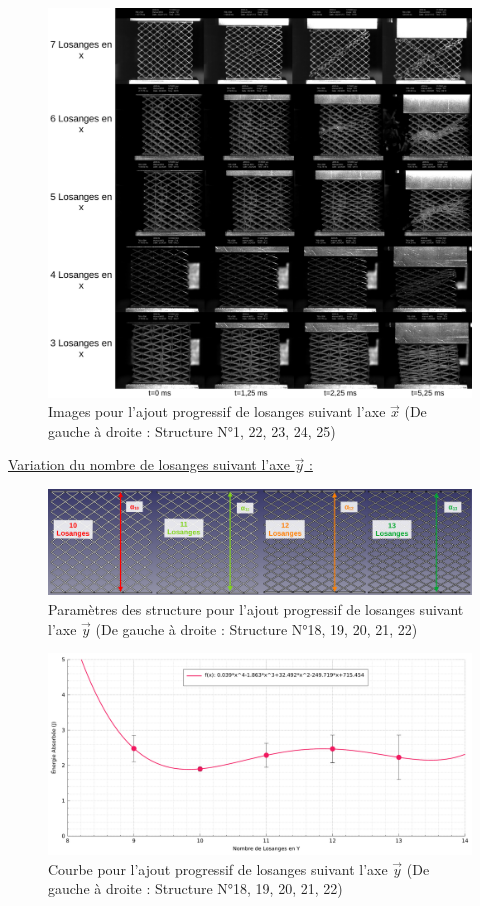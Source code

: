 \documentclass[a4paper]{article}
\begin{document}
	\begin{figure}[H]
		\centering
		\includegraphics[width=16cm]{Images/7/7_4/7_4_8/instants_x.pdf}
		\caption{Images pour l'ajout progressif de losanges suivant l'axe $\vec{x}$ (De gauche à droite : Structure N°1, 22, 23, 24, 25)}
	\end{figure}

	\underline{Variation du nombre de losanges suivant l'axe $\vec{y}$ :}
	
	\begin{figure}[H]
		\centering
		\includegraphics[width=14cm]{Images/7/7_4/7_4_8/gradient_losange_y.pdf}
		\caption{Paramètres des structure pour l'ajout progressif de losanges suivant l'axe $\vec{y}$ (De gauche à droite : Structure N°18, 19, 20, 21, 22)}
	\end{figure}

	\begin{figure}[H]
		\centering
		\includegraphics[width=13cm]{Images/7/7_4/7_4_8/nb_losange_y.pdf}
		\caption{Courbe pour l'ajout progressif de losanges suivant l'axe $\vec{y}$ (De gauche à droite : Structure N°18, 19, 20, 21, 22)}
	\end{figure}
\end{document}
